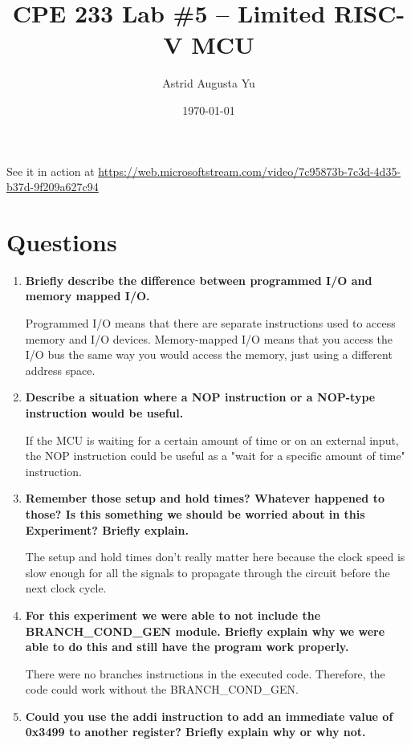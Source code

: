 \documentclass{article}
\author{Astrid Augusta Yu}
\title{CPE 233 Lab \#5 -- Limited RISC-V MCU}
\date{\today}
\begin{document}
\maketitle

\begin{center}
    \large
    See it in action at \url{https://web.microsoftstream.com/video/7c95873b-7c3d-4d35-b37d-9f209a627c94}    
\end{center}

\tableofcontents

\section{Questions}

\begin{enumerate}
    \item \textbf{Briefly describe the difference between programmed I/O and memory mapped I/O. }
        
        Programmed I/O means that there are separate instructions used to access memory and I/O devices. 
        Memory-mapped I/O means that you access the I/O bus the same way you would access the memory, just 
        using a different address space. 
    \item \textbf{Describe a situation where a NOP instruction or a NOP-type instruction would be useful.}
        
        If the MCU is waiting for a certain amount of time or on an external input, the NOP instruction could 
        be useful as a "wait for a specific amount of time" instruction.
    \item \textbf{Remember those setup and hold times? Whatever happened to those? Is this something we should be worried about in this Experiment? Briefly explain. }
    
        The setup and hold times don't really matter here because the clock speed is slow enough for all the 
        signals to propagate through the circuit before the next clock cycle. 
    \item \textbf{For this experiment we were able to not include the BRANCH\_COND\_GEN module. Briefly explain why we were able to do this and still have the program work properly.}
    
        There were no branches instructions in the executed code. Therefore, the code could work 
        without the BRANCH\_COND\_GEN.
    \item \textbf{Could you use the addi instruction to add an immediate value of 0x3499 to another register? Briefly explain why or why not.}
        

\end{enumerate}
\end{document}
